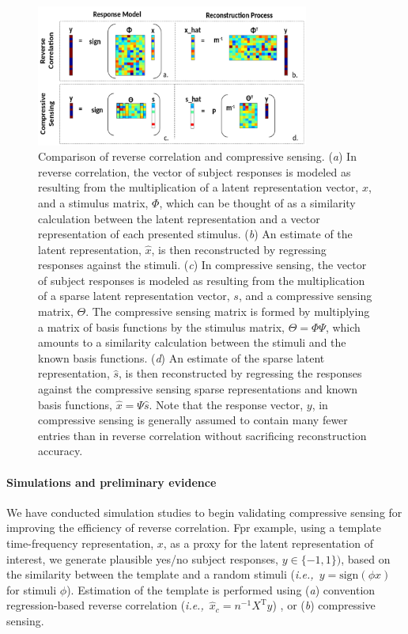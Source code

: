 \documentclass[11pt, notitlepage]{article} %
\def\ie{{\emph{i.e.,}}~}
\begin{document}
\begin{figure}[h] %
	\centering
	\includegraphics[width=0.8\textwidth]{Figures/Figures_tinnitus_5.png}
	\caption{Comparison of reverse correlation and compressive sensing.
	(\emph{a}) In reverse correlation, the vector of subject responses is modeled as
	resulting from the multiplication of a latent representation vector, $x$,
	and a stimulus matrix, $\Phi$, which can be thought of as a similarity calculation
	between the latent representation and a vector representation of each presented stimulus.
	(\emph{b}) An estimate of the latent representation, $\hat{x}$, is then reconstructed
	by regressing responses against the stimuli.
	(\emph{c}) In compressive sensing,
	the vector of subject responses is modeled as resulting from the multiplication
	of a sparse latent representation vector, $s$, and a compressive sensing matrix, $\Theta$.
	The compressive sensing matrix is formed by multiplying a matrix of basis functions
	by the stimulus matrix, $\Theta = \Phi \Psi$, which amounts to a similarity calculation
	between the stimuli and the known basis functions.
	(\emph{d}) An estimate of the sparse latent representation, $\hat{s}$, is then reconstructed
	by regressing the responses against the compressive sensing sparse representations
	and known basis functions, $\hat{x} = \Psi \hat{s}$. Note that the response vector, $y$,
	in compressive sensing is generally assumed to contain many fewer entries than
	in reverse correlation without sacrificing reconstruction accuracy.}
	\label{fig:csexplanation}
\end{figure}

\paragraph{Simulations and preliminary evidence}

We have conducted simulation studies to begin validating compressive sensing
for improving the efficiency of reverse correlation.
Fpr example, using a template time-frequency representation, $x$,
as a proxy for the latent representation of interest,
we generate plausible yes/no subject responses, $y \in \{-1, 1\})$,
based on the similarity between the template
and a random stimuli (\ie $y = \mathrm{sign}(\phi x)$ for stimuli $\phi$).
Estimation of the template is performed using
(\emph{a}) convention regression-based reverse correlation
(\ie $\hat{x}_c = n^{-1} X^\mathrm{T}y$) \cite{gosselinSuperstitiousPerceptionsReveal2003},
or (\emph{b}) compressive sensing.
\end{document}
